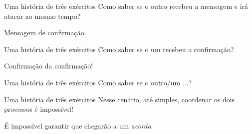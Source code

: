 \begin{frame}{Uma história de três exércitos}
Como saber se o outro recebeu a mensagem e irá atacar ao mesmo tempo?

\pause
Mensagem de confirmação.
\end{frame}

\begin{frame}{Uma história de três exércitos}
Como saber se o um recebeu a confirmação?

\pause
Confirmação da confirmação!
\end{frame}


\begin{frame}{Uma história de três exércitos}
Como saber se o outro/um ...?
\end{frame}


\begin{frame}{Uma história de três exércitos}
Nesse cenário, até simples, coordenar os dois processos é \alert{impossível}!

\pause É impossível garantir que chegarão a um \emph{acordo}.
\end{frame}


